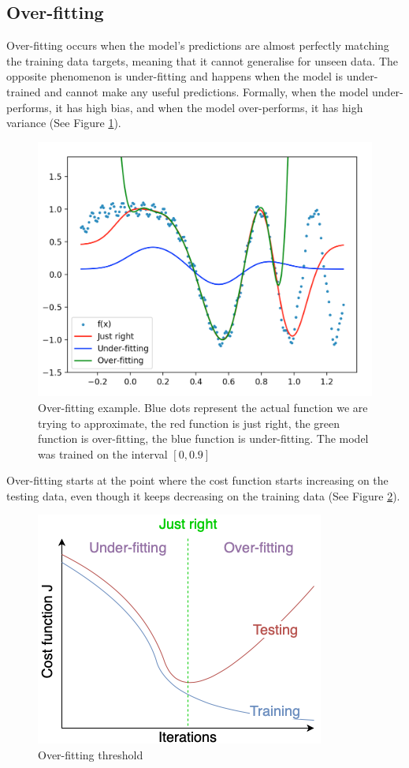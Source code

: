 \subsection{Over-fitting}
Over-fitting \cite{ml, russell2016artificial, Goodfellow-et-al-2016} occurs when the model's predictions are almost perfectly matching the training data targets, meaning that it cannot generalise for unseen data. The opposite phenomenon is under-fitting and happens when the model is under-trained and cannot make any useful predictions. Formally, when the model under-performs, it has high bias, and when the model over-performs, it has high variance (See Figure \ref{fig:overfit}).

\begin{figure}[h!]
  \centering
  \includegraphics[scale=0.32]{images/overfit.png}
  \caption{Over-fitting example. Blue dots represent the actual function we are trying to approximate, the red function is just right, the green function is over-fitting, the blue function is under-fitting. The model was trained on the interval $[0, 0.9]$}
  \label{fig:overfit}
\end{figure}

Over-fitting starts at the point where the cost function starts increasing on the testing data, even though it keeps decreasing on the training data (See Figure \ref{fig:overfit_thresh}).

\begin{figure}[h!]
  \centering
  \includegraphics[scale=0.6]{images/overfit_tresh.png}
  \caption{Over-fitting threshold}
  \label{fig:overfit_thresh}
\end{figure}

